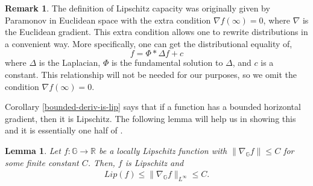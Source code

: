 \documentclass[12pt,a4paper,reqno]{amsart}
\newcommand{\G}{\mathbb{G}}
\numberwithin{equation}{section}
\newtheorem{lem}[thm]{Lemma}
\theoremstyle{definition}
\newtheorem{rem}[thm]{Remark}
\begin{document}
\begin{rem}
The definition of Lipschitz capacity was originally given by Paramonov \cite[Definition 2.1]{P} in Euclidean space with the extra condition $\nabla f(\infty) = 0$, where $\nabla$ is the Euclidean gradient. This extra condition allows one to rewrite distributions in a convenient way. More specifically, one can get the distributional equality of, $$f = \Phi \ast \Delta f +c$$ where $\Delta$ is the Laplacian, $\Phi$ is the fundamental solution to $\Delta$, and $c$ is a constant. This relationship will not be needed for our purposes, so we omit the condition $\nabla f(\infty) = 0$.
\end{rem}

Corollary \ref{bounded-deriv-is-lip} says that if a function has a bounded horizontal gradient, then it is Lipschitz. The following lemma will help us in showing this and it is essentially one half of \cite[Lemma 3.1]{LDPS}.
\begin{lem}\label{local-implies-global}
 Let $f : \G \rightarrow \mathbb{R}$ be a locally Lipschitz function with $\| \nabla_{\G} f\| \leq C$ for some finite constant $C$. Then, $f$ is Lipschitz and \begin{align*}
     Lip(f) \leq \| \nabla_{\G} f\|_{L^{\infty}} \leq C.
 \end{align*}
\end{lem}
\end{document}
